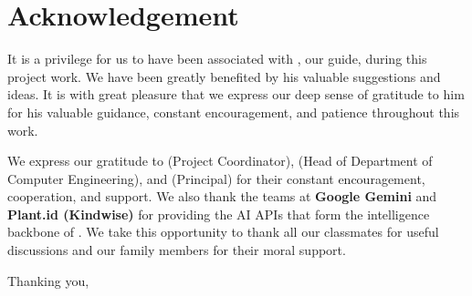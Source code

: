 \chapter*{Acknowledgement}

It is a privilege for us to have been associated with \textbf{\Supervisor}, our
guide, during this project work. We have been greatly benefited by his valuable
suggestions and ideas. It is with great pleasure that we express our deep sense of
gratitude to him for his valuable guidance, constant encouragement, and patience
throughout this work.

We express our gratitude to \textbf{\ProjectCoordinator} (Project Coordinator),
\textbf{\HOD} (Head of Department of Computer Engineering), and
\textbf{\Principal} (Principal) for their constant encouragement, cooperation,
and support. We also thank the teams at \textbf{Google Gemini} and \textbf{Plant.id
(Kindwise)} for providing the AI APIs that form the intelligence backbone of \ProjectShortName.
We take this opportunity to thank all our classmates for useful discussions and our family
members for their moral support.

Thanking you,

\vspace{1.5cm}
\noindent\hfill
\begin{minipage}{4cm}
    \textbf{\StudentOne} \\[0.6cm]
    \textbf{\StudentTwo} \\[0.6cm]
    \textbf{\StudentThree}
\end{minipage}

